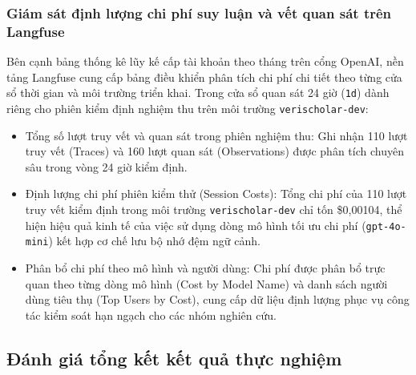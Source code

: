 \subsubsection{Giám sát định lượng chi phí suy luận và vết quan sát trên Langfuse}
\label{subsubsec:monitor_langfuse_dashboard}

Bên cạnh bảng thống kê lũy kế cấp tài khoản theo tháng trên cổng OpenAI, nền tảng Langfuse cung cấp bảng điều khiển phân tích chi phí chi tiết theo từng cửa sổ thời gian và môi trường triển khai. Trong cửa sổ quan sát 24 giờ (\texttt{1d}) dành riêng cho phiên kiểm định nghiệm thu trên môi trường \texttt{verischolar-dev}:
\begin{itemize}[noitemsep, topsep=1pt]
    \item Tổng số lượt truy vết và quan sát trong phiên nghiệm thu: Ghi nhận 110 lượt truy vết (Traces) và 160 lượt quan sát (Observations) được phân tích chuyên sâu trong vòng 24 giờ kiểm định.
    \item Định lượng chi phí phiên kiểm thử (Session Costs): Tổng chi phí của 110 lượt truy vết kiểm định trong môi trường \texttt{verischolar-dev} chỉ tốn \$0{,}00104, thể hiện hiệu quả kinh tế của việc sử dụng dòng mô hình tối ưu chi phí (\texttt{gpt-4o-mini}) kết hợp cơ chế lưu bộ nhớ đệm ngữ cảnh.
    \item Phân bổ chi phí theo mô hình và người dùng: Chi phí được phân bổ trực quan theo từng dòng mô hình (Cost by Model Name) và danh sách người dùng tiêu thụ (Top Users by Cost), cung cấp dữ liệu định lượng phục vụ công tác kiểm soát hạn ngạch cho các nhóm nghiên cứu.
\end{itemize}

\subsection{Đánh giá tổng kết kết quả thực nghiệm}
\label{subsec:tong_ket_thuc_nghiem}

